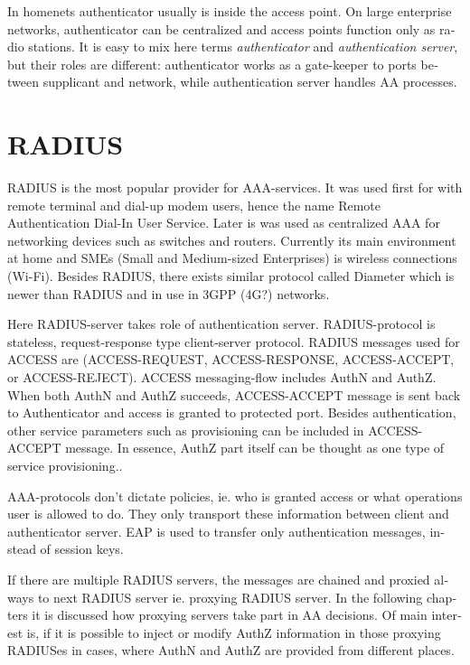 \documentclass[12pt,a4paper,english]{tutthesis}
\begin{document}
\begin{otherlanguage}{english}
In homenets authenticator usually is inside the access point.
On large enterprise networks, authenticator can be centralized 
and access points function only as radio stations.
It is easy to mix here terms \emph{authenticator} and \emph{authentication
server}, but their roles are different: authenticator works as a
gate-keeper to ports between supplicant and network, while
authentication server handles AA processes.

\section{RADIUS}
\label{sec-2-2}
\label{section:radius}
RADIUS is the most popular provider for
AAA-services\cite[p.75]{radius-popular}.  It was used first for
with remote terminal and dial-up modem users, hence the name Remote
Authentication Dial-In User Service. Later is was used as centralized AAA
for networking devices such as switches and routers.  Currently its
main environment at home and SMEs (Small and Medium-sized Enterprises) is
wireless connections (Wi-Fi).  Besides RADIUS, there exists similar protocol
called Diameter which is newer than RADIUS and in use in 3GPP (4G?)
networks. 

Here RADIUS-server takes role of authentication server.
RADIUS-protocol is stateless, request-response type client-server
protocol.  RADIUS messages used for ACCESS are (ACCESS-REQUEST,
ACCESS-RESPONSE, ACCESS-ACCEPT, or ACCESS-REJECT). ACCESS
messaging-flow includes AuthN and AuthZ. When both AuthN and AuthZ
succeeds, ACCESS-ACCEPT message is sent back to Authenticator and
access is granted to protected port.  Besides authentication, other
service parameters such as provisioning can be included in
ACCESS-ACCEPT message. In essence, AuthZ part itself can be thought as
one type of service provisioning.\cite{rfc5608}.




AAA-protocols don't dictate policies, ie. who is granted access or
what operations user is allowed to do. They only transport these information
between client and authenticator server.
EAP is used to transfer only authentication messages, instead   of
session keys. 

If there are multiple RADIUS servers, the messages are chained and
proxied always to next RADIUS server ie. proxying RADIUS server.
In the following chapters it is discussed how proxying servers take 
part in AA decisions. Of main interest is, if it is possible 
to inject or modify AuthZ information in those proxying RADIUSes in cases, 
where AuthN and AuthZ are provided from different
places\cite{rfc2607}.



\end{otherlanguage}
\end{document}
